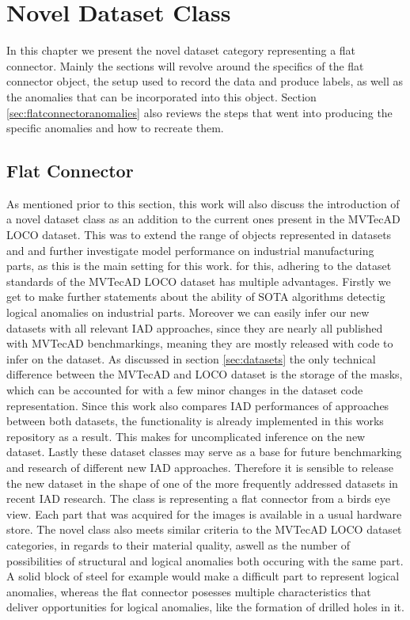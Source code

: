 \chapter{Novel Dataset Class}
\label{chap:datasets}

In this chapter we present the novel dataset category representing a flat connector. Mainly the sections will revolve around the specifics of the flat connector object, the setup used to 
record the data and produce labels, as well as the anomalies that can be incorporated into this object. Section \ref{sec:flatconnectoranomalies} also reviews the steps that went into producing the specific anomalies 
and how to recreate them.


\section{Flat Connector}
\label{sec:faltconnectordesscription}

As mentioned prior to this section, this work will also discuss the introduction of a novel dataset class as an addition to the current ones present in the MVTecAD LOCO dataset.
This was to extend the range of objects represented in datasets \cite{MVTEC_Bergmann_2021} and \cite{LOCODentsAndScratchesBergmann2022} and further investigate model performance on industrial manufacturing parts, as this is the 
main setting for this work. for this, adhering to the dataset standards of the MVTecAD LOCO dataset has multiple advantages. Firstly we get to make further statements about the ability of SOTA algorithms detectig 
logical anomalies on industrial parts. Moreover we can easily infer our new datasets with all relevant IAD approaches, since they are nearly all published with MVTecAD benchmarkings, meaning 
they are mostly released with code to infer on the dataset. As discussed in section \ref{sec:datasets} the only technical difference between the MVTecAD and LOCO dataset is the storage of the masks, 
which can be accounted for with a few minor changes in the dataset code representation. Since this work also compares IAD performances of approaches between both datasets, the functionality 
is already implemented in this works repository as a result. This makes for uncomplicated inference on the new dataset. Lastly these dataset classes may serve as a base for future benchmarking 
and research of different new IAD approaches. Therefore it is sensible to release the new dataset in the shape of one of the more frequently addressed datasets in recent IAD research. 
The class is representing a flat connector from a birds eye view. Each part that was acquired for the images is available in a 
usual hardware store. The novel class also 
meets similar criteria to the MVTecAD LOCO dataset categories, in regards to their material quality, aswell as the number of possibilities of structural and logical anomalies both occuring with the same part. A solid block of steel for example 
would make a difficult part to represent logical anomalies, whereas the flat connector posesses multiple characteristics that deliver opportunities for logical anomalies, like the formation of drilled holes in it.

